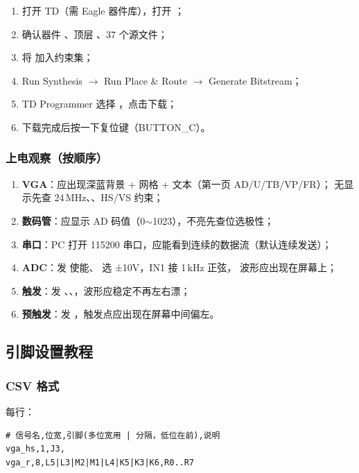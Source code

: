 \begin{enumerate}[leftmargin=2em,itemsep=2pt]
  \item 打开 TD（需 Eagle 器件库），打开 ；
  \item 确认器件 、顶层 、37 个源文件；
  \item 将  加入约束集；
  \item Run Synthesis $\rightarrow$ Run Place \& Route $\rightarrow$ Generate Bitstream；
  \item TD Programmer 选择 ，点击下载；
  \item 下载完成后按一下复位键（BUTTON\_C）。
\end{enumerate}

\subsubsection{上电观察（按顺序）}

\begin{enumerate}[leftmargin=2em,itemsep=2pt]
  \item \textbf{VGA}：应出现深蓝背景 + 网格 + 文本（第一页 AD/U/TB/VP/FR）；
        无显示先查 24\,MHz、、HS/VS 约束；
  \item \textbf{数码管}：应显示 AD 码值（0$\sim$1023），不亮先查位选极性；
  \item \textbf{串口}：PC 打开 115200 串口，应能看到连续的数据流（默认连续发送）；
  \item \textbf{ADC}：发  使能、 选 ±10V，IN1 接 1\,kHz 正弦，
        波形应出现在屏幕上；
  \item \textbf{触发}：发 、、，波形应稳定不再左右漂；
  \item \textbf{预触发}：发 ，触发点应出现在屏幕中间偏左。
\end{enumerate}

\subsection{引脚设置教程}

\subsubsection{CSV 格式}

 每行：

\begin{lstlisting}[style=vsnip]
# 信号名,位宽,引脚(多位宽用 | 分隔，低位在前),说明
vga_hs,1,J3,
vga_r,8,L5|L3|M2|M1|L4|K5|K3|K6,R0..R7
\end{lstlisting}

